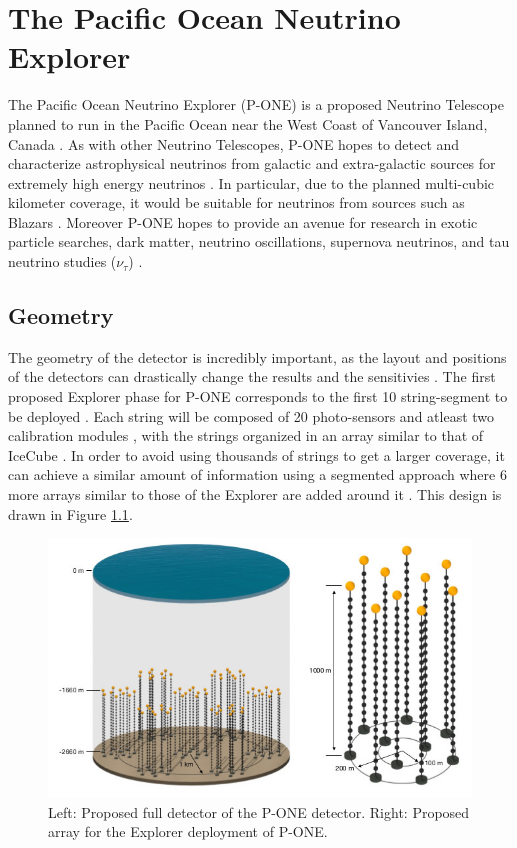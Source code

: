 \chapter{The Pacific Ocean Neutrino Explorer}

The  Pacific Ocean Neutrino Explorer (P-ONE) is a proposed Neutrino Telescope planned to run in the Pacific Ocean near the West Coast of Vancouver Island, Canada \cite{pone}. As with other Neutrino Telescopes, P-ONE hopes to detect and characterize astrophysical neutrinos from galactic and extra-galactic sources for extremely high energy neutrinos \cite{pone}. In particular, due to the planned multi-cubic kilometer coverage, it would be suitable for neutrinos from sources such as Blazars \cite{icecube_nat}. Moreover P-ONE hopes to provide an avenue for research in exotic particle searches, dark matter, neutrino oscillations, supernova neutrinos, and tau neutrino studies ($\nu_{\tau}$) \cite{pone}. 

\section{Geometry}

The geometry of the detector is incredibly important, as the layout and positions of the detectors can drastically change the results and the sensitivies \cite{icecube}. The first proposed Explorer phase for P-ONE corresponds to the first 10 string-segment to be deployed \cite{pone}. Each string will be composed of 20 photo-sensors and atleast two calibration modules \cite{pone}, with the strings organized in an array similar to that of IceCube \cite{pone,icecube}. In order to avoid using thousands of strings to get a larger coverage, it can achieve a similar amount of information using a segmented approach where 6 more arrays similar to those of the Explorer are added around it \cite{pone}. This design is drawn in Figure \ref{fig:pone_geo}. 

\begin{figure}[h]
  \centering
  \includegraphics[width=12cm]{./Figures/PONEv0_-23_design.jpg}
  \caption{Left: Proposed full detector of the P-ONE detector. Right: Proposed array for the Explorer deployment of P-ONE.}
  \label{fig:pone_geo}
\end{figure}


